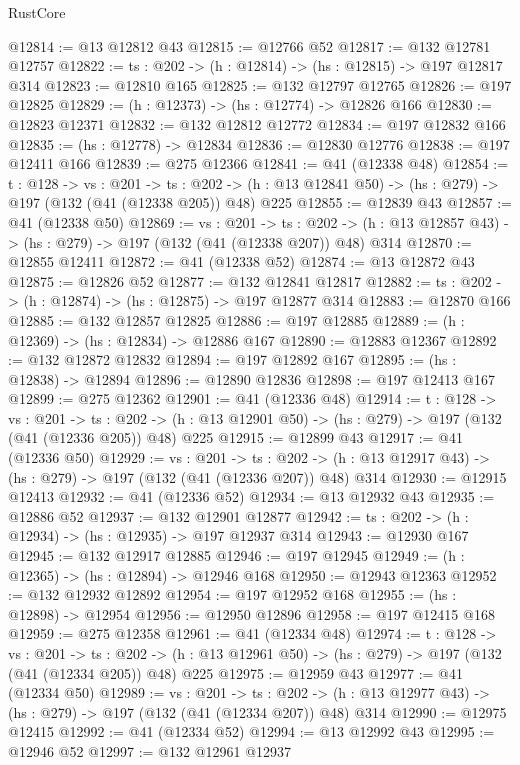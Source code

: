 \begin{lexlean}{RustCore}
\begin{coremodule}
@12814 := @13 @12812 @43
@12815 := @12766 @52
@12817 := @132 @12781 @12757
@12822 := {ts : @202} -> (h : @12814) -> (hs : @12815) -> @197 @12817 @314
@12823 := @12810 @165
@12825 := @132 @12797 @12765
@12826 := @197 @12825
@12829 := (h : @12373) -> (hs : @12774) -> @12826 @166
@12830 := @12823 @12371
@12832 := @132 @12812 @12772
@12834 := @197 @12832 @166
@12835 := (hs : @12778) -> @12834
@12836 := @12830 @12776
@12838 := @197 @12411 @166
@12839 := @275 @12366
@12841 := @41 (@12338 @48)
@12854 := {t : @128} ->
  {vs : @201} ->
  {ts : @202} -> (h : @13 @12841 @50) -> (hs : @279) -> @197 (@132 (@41 (@12338 @205)) @48) @225
@12855 := @12839 @43
@12857 := @41 (@12338 @50)
@12869 := {vs : @201} ->
  {ts : @202} -> (h : @13 @12857 @43) -> (hs : @279) -> @197 (@132 (@41 (@12338 @207)) @48) @314
@12870 := @12855 @12411
@12872 := @41 (@12338 @52)
@12874 := @13 @12872 @43
@12875 := @12826 @52
@12877 := @132 @12841 @12817
@12882 := {ts : @202} -> (h : @12874) -> (hs : @12875) -> @197 @12877 @314
@12883 := @12870 @166
@12885 := @132 @12857 @12825
@12886 := @197 @12885
@12889 := (h : @12369) -> (hs : @12834) -> @12886 @167
@12890 := @12883 @12367
@12892 := @132 @12872 @12832
@12894 := @197 @12892 @167
@12895 := (hs : @12838) -> @12894
@12896 := @12890 @12836
@12898 := @197 @12413 @167
@12899 := @275 @12362
@12901 := @41 (@12336 @48)
@12914 := {t : @128} ->
  {vs : @201} ->
  {ts : @202} -> (h : @13 @12901 @50) -> (hs : @279) -> @197 (@132 (@41 (@12336 @205)) @48) @225
@12915 := @12899 @43
@12917 := @41 (@12336 @50)
@12929 := {vs : @201} ->
  {ts : @202} -> (h : @13 @12917 @43) -> (hs : @279) -> @197 (@132 (@41 (@12336 @207)) @48) @314
@12930 := @12915 @12413
@12932 := @41 (@12336 @52)
@12934 := @13 @12932 @43
@12935 := @12886 @52
@12937 := @132 @12901 @12877
@12942 := {ts : @202} -> (h : @12934) -> (hs : @12935) -> @197 @12937 @314
@12943 := @12930 @167
@12945 := @132 @12917 @12885
@12946 := @197 @12945
@12949 := (h : @12365) -> (hs : @12894) -> @12946 @168
@12950 := @12943 @12363
@12952 := @132 @12932 @12892
@12954 := @197 @12952 @168
@12955 := (hs : @12898) -> @12954
@12956 := @12950 @12896
@12958 := @197 @12415 @168
@12959 := @275 @12358
@12961 := @41 (@12334 @48)
@12974 := {t : @128} ->
  {vs : @201} ->
  {ts : @202} -> (h : @13 @12961 @50) -> (hs : @279) -> @197 (@132 (@41 (@12334 @205)) @48) @225
@12975 := @12959 @43
@12977 := @41 (@12334 @50)
@12989 := {vs : @201} ->
  {ts : @202} -> (h : @13 @12977 @43) -> (hs : @279) -> @197 (@132 (@41 (@12334 @207)) @48) @314
@12990 := @12975 @12415
@12992 := @41 (@12334 @52)
@12994 := @13 @12992 @43
@12995 := @12946 @52
@12997 := @132 @12961 @12937

\end{coremodule}
\end{lexlean}

